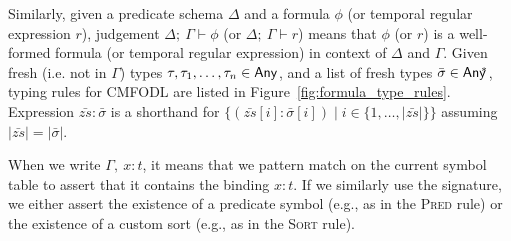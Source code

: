 Similarly, given a predicate schema $\Delta$ and a formula $\phi$ (or temporal regular expression $r$), judgement $\Delta;\ \Gamma \vdash  \phi$ (or $\Delta; \ \Gamma \vdash  r$) means that $\phi$ (or $r$) is a well-formed formula (or temporal regular expression) in context of $\Delta$ and $\Gamma$. Given fresh (i.e. not in $\Gamma$) types $\tau,\tau_1,\ldots,\tau_n\in\mathsf{Any}{}$, and a list of fresh types $\bar{\sigma}\in\mathsf{Any}\!\!^*$, typing rules for CMFODL are listed in Figure~\ref{fig:formula_type_rules}. Expression $\bar{zs}:\bar{\sigma}$ is a shorthand for $\{(\bar{zs}[i]: \bar{\sigma}[i]) \mid i\in\{1,\ldots,|\bar{zs}|\}\}$ assuming $|\bar{zs}|=|\bar{\sigma}|$.

When we write $\Gamma,\ x:t$, it means that we pattern match on the current symbol table to assert that it contains the binding $x:t$.
If we similarly use the signature, we either assert the existence of a predicate symbol (e.g., as in the \textsc{Pred} rule) or the existence of a custom sort (e.g., as in the \textsc{Sort} rule).

